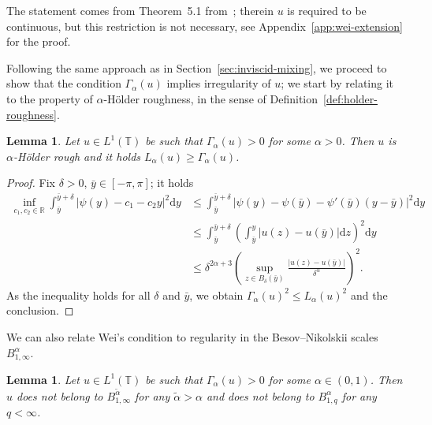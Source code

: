 \documentclass[11pt,oneside,reqno]{amsart}
\newcommand{\mathd}{\mathrm{d}}
\newtheorem{lemma}[theorem]{Lemma}
\numberwithin{equation}{section}
\begin{document}
The statement comes from Theorem~5.1 from~{\cite{wei}}; therein $u$ is
required to be continuous, but this restriction is not necessary, see
Appendix~\ref{app:wei-extension} for the proof.

Following the same approach as in Section~\ref{sec:inviscid-mixing}, we
proceed to show that the condition $\Gamma_{\alpha} (u)$ implies irregularity
of $u$; we start by relating it to the property of $\alpha$-H\"{o}lder
roughness, in the sense of Definition~\ref{def:holder-roughness}.

\begin{lemma}
  Let $u \in L^1 (\mathbb{T})$ be such that $\Gamma_{\alpha} (u) > 0$ for some
  $\alpha > 0$. Then $u$ is $\alpha$\mbox{-}H\"{o}lder rough and it holds
  $L_{\alpha} (u) \geqslant \Gamma_{\alpha} (u)$.
\end{lemma}

\begin{proof}
  Fix $\delta > 0$, $\bar{y} \in [- \pi, \pi]$; it holds
%  
  \begin{align*}
    \inf_{c_1, c_2 \in \mathbb{R}} \int_{\bar{y}}^{\bar{y} + \delta} | \psi
    (y) - c_1 - c_2 y |^2 \mathd y & \leqslant \int_{\bar{y}}^{\bar{y} +
    \delta} | \psi (y) - \psi (\bar{y}) - \psi' (\bar{y}) (y - \bar{y}) |^2
    \mathd y\\
    & \leqslant \int_{\bar{y}}^{\bar{y} + \delta} \left( \int_{\bar{y}}^y | u
    (z) - u (\bar{y}) | \mathd z \right)^2 \mathd y\\
    & \leqslant \delta^{2 \alpha + 3}  \left( \sup_{z \in B_{\delta}
    (\bar{y})} \frac{| u (z) - u (\bar{y}) |}{\delta^{\alpha}} \right)^2 .
  \end{align*}
%  
  As the inequality holds for all $\delta$ and $\bar{y}$, we obtain
  $\Gamma_{\alpha} (u)^2 \leqslant L_{\alpha} (u)^2$ and the conclusion.
\end{proof}

We can also relate Wei's condition to regularity in the Besov--Nikolskii
scales $B^{\alpha}_{1, \infty}$.

\begin{lemma}
  \label{lem:irr-wei}Let $u \in L^1 (\mathbb{T})$ be such that
  $\Gamma_{\alpha} (u) > 0$ for some $\alpha \in (0, 1)$. Then $u$ does not
  belong to $B^{\tilde{\alpha}}_{1, \infty}$ for any $\tilde{\alpha} > \alpha$
  and does not belong to $B^{\alpha}_{1, q}$ for any $q < \infty$.
\end{lemma}
\end{document}
